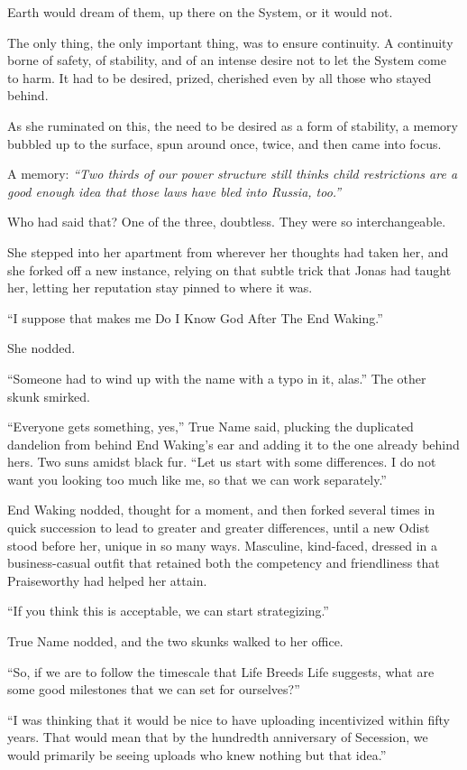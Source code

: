 Earth would dream of them, up there on the System, or it would not.

The only thing, the only important thing, was to ensure continuity. A continuity borne of safety, of stability, and of an intense desire not to let the System come to harm. It had to be desired, prized, cherished even by all those who stayed behind.

As she ruminated on this, the need to be desired as a form of stability, a memory bubbled up to the surface, spun around once, twice, and then came into focus.

A memory: \emph{``Two thirds of our power structure still thinks child restrictions are a good enough idea that those laws have bled into Russia, too.''}

Who had said that? One of the three, doubtless. They were so interchangeable.

She stepped into her apartment from wherever her thoughts had taken her, and she forked off a new instance, relying on that subtle trick that Jonas had taught her, letting her reputation stay pinned to where it was.

``I suppose that makes me Do I Know God After The End Waking.''

She nodded.

``Someone had to wind up with the name with a typo in it, alas.'' The other skunk smirked.

``Everyone gets something, yes,'' True Name said, plucking the duplicated dandelion from behind End Waking's ear and adding it to the one already behind hers. Two suns amidst black fur. ``Let us start with some differences. I do not want you looking too much like me, so that we can work separately.''

End Waking nodded, thought for a moment, and then forked several times in quick succession to lead to greater and greater differences, until a new Odist stood before her, unique in so many ways. Masculine, kind-faced, dressed in a business-casual outfit that retained both the competency and friendliness that Praiseworthy had helped her attain.

``If you think this is acceptable, we can start strategizing.''

True Name nodded, and the two skunks walked to her office.

``So, if we are to follow the timescale that Life Breeds Life suggests, what are some good milestones that we can set for ourselves?''

``I was thinking that it would be nice to have uploading incentivized within fifty years. That would mean that by the hundredth anniversary of Secession, we would primarily be seeing uploads who knew nothing but that idea.''

